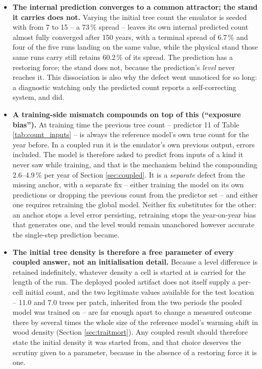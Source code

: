 \documentclass[11pt]{article}
\begin{document}
\begin{itemize}[leftmargin=1.4em]
\item \textbf{The internal prediction converges to a common attractor; the stand it carries does not.} Varying the initial tree count the emulator is seeded with from 7 to 15 -- a 73\,\% spread -- leaves its own internal predicted count almost fully converged after 150 years, with a terminal spread of 6.7\,\% and four of the five runs landing on the same value, while the physical stand those same runs carry still retains 60.2\,\% of its spread. The prediction has a restoring force; the stand does not, because the prediction's \emph{level} never reaches it. This dissociation is also why the defect went unnoticed for so long: a diagnostic watching only the predicted count reports a self-correcting system, and did.
\item \textbf{A training-side mismatch compounds on top of this (``exposure bias'').} At training time the previous tree count -- predictor 11 of Table \ref{tab:count_inputs} -- is always the reference model's own true count for the year before. In a coupled run it is the emulator's own previous output, errors included. The model is therefore asked to predict from inputs of a kind it never saw while training, and that is the mechanism behind the compounding 2.6--4.9\,\% per year of Section \ref{sec:coupled}. It is a \emph{separate} defect from the missing anchor, with a separate fix -- either training the model on its own predictions or dropping the previous count from the predictor set -- and either one requires retraining the global model. Neither fix substitutes for the other: an anchor stops a level error persisting, retraining stops the year-on-year bias that generates one, and the level would remain unanchored however accurate the single-step prediction became.
\item \textbf{The initial tree density is therefore a free parameter of every coupled answer, not an initialisation detail.} Because a level difference is retained indefinitely, whatever density a cell is started at is carried for the length of the run. The deployed pooled artifact does not itself supply a per-cell initial count, and the two legitimate values available for the test location -- 11.0 and 7.0 trees per patch, inherited from the two periods the pooled model was trained on -- are far enough apart to change a measured outcome there by several times the whole size of the reference model's warming shift in wood density (Section \ref{sec:traitmort}). Any coupled result should therefore state the initial density it was started from, and that choice deserves the scrutiny given to a parameter, because in the absence of a restoring force it is one.
\end{itemize}
\end{document}
